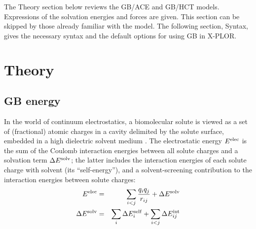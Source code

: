 \documentclass[12pt]{report}
\begin{document}
The Theory section below reviews the GB/ACE and GB/HCT models. Expressions of the
solvation energies and forces are given. This section can be skipped by those already
familiar with the model. The following section, Syntax, gives the necessary syntax and
the default options for using GB in X-PLOR. 

\section{Theory}
\subsection{GB energy}
In the world of continuum electrostatics, a biomolecular solute is viewed as
a set of (fractional) atomic charges in a cavity delimited by the solute surface,
embedded in a high dielectric solvent medium \cite{Kirkwood38}. The electrostatic
energy $E^{\rm elec}$ is the sum of the Coulomb interaction energies between all
solute charges and a solvation term $\Delta E^{\rm solv}$; the latter includes the
interaction energies of each solute charge with solvent (its ``self-energy''), and
a solvent-screening contribution to the interaction energies between solute charges:
\begin{eqnarray}
E^{\rm elec} &=& \sum_{i < j} \frac{q_i q_j}{r_{ij}} + \Delta E^{\rm solv} \\
\Delta E^{\rm solv} &=& 
   \sum_i \Delta E_i^{\rm self} + \sum_{i < j} \Delta E_{ij}^{\rm int}  \label{eq:gbenergy}
\end{eqnarray}
\end{document}
